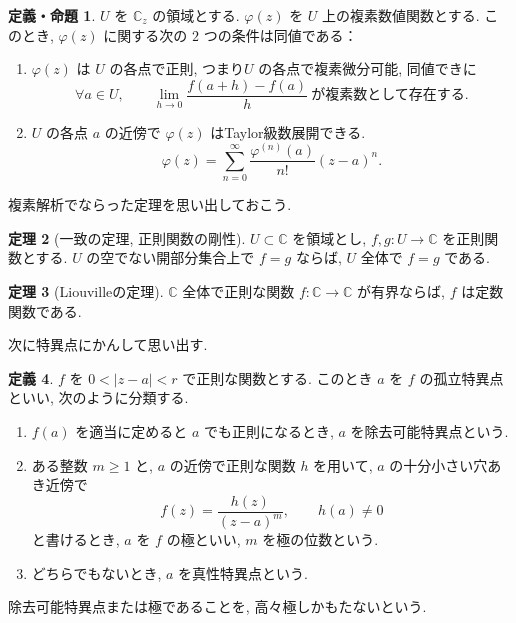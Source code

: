 \documentclass[dvipdfmx,a4paper,11pt]{article} %
\newcommand{\C}{\mathbb{C}}
\theoremstyle{definition}
\newtheorem{thm}{定理}[section]
\numberwithin{equation}{section}
\newtheorem{dfn}[thm]{定義}
\newtheorem{dfnprop}[thm]{定義・命題}
\begin{document}
\begin{dfnprop}\label{O-M015}
$U$ を $\C{}_z$ の領域とする. $\varphi(z)$ を $U$ 上の複素数値関数とする. このとき, $\varphi(z)$ に関する次の $2$ つの条件は同値である：
\begin{enumerate}
\item
$\varphi(z)$ は $U$ の各点で正則, つまり$U$ の各点で複素微分可能, 同値できに
\[
\forall a\in U,\qquad \lim_{h\to 0}\frac{f(a+h)-f(a)}{h}\ \text{が複素数として存在する.}
\]
\item
$U$ の各点 $a$ の近傍で $\varphi(z)$ はTaylor級数展開できる.
\[
\varphi(z)=\sum_{n=0}^{\infty}\frac{\varphi^{(n)}(a)}{n!}(z-a)^n.
\]
\end{enumerate}
\end{dfnprop}

複素解析でならった定理を思い出しておこう. 
\begin{thm}[一致の定理, 正則関数の剛性]\label{thm-identity-plane}
$U\subset\C$ を領域とし, $f,g:U\to\C$ を正則関数とする.
$U$ の空でない開部分集合上で $f=g$ ならば, $U$ 全体で $f=g$ である.
\end{thm}
\begin{thm}[Liouvilleの定理]
\label{thm-Liouville}
$\C$ 全体で正則な関数 $f:\C\to\C$ が有界ならば, $f$ は定数関数である.
\end{thm}

次に特異点にかんして思い出す. 


\begin{dfn}
$f$ を $0<|z-a|<r$ で正則な関数とする.
このとき $a$ を $f$ の孤立特異点といい, 次のように分類する.
\begin{enumerate}
\item $f(a)$ を適当に定めると $a$ でも正則になるとき, 
$a$ を除去可能特異点という.
\item
ある整数 $m\geq1$ と, $a$ の近傍で正則な関数 $h$ を用いて, 
$a$ の十分小さい穴あき近傍で
\[
f(z)=\frac{h(z)}{(z-a)^m},
\qquad h(a)\neq0
\]
と書けるとき, $a$ を $f$ の極といい, 
$m$ を極の位数という.
\item どちらでもないとき, $a$ を真性特異点という.
\end{enumerate}
除去可能特異点または極であることを, 高々極しかもたないという.
\end{dfn}
\end{document}
